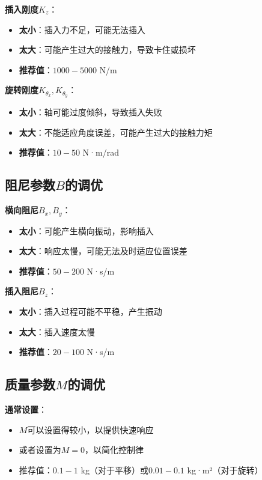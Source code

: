 \documentclass[12pt,a4paper]{article}
\begin{document}
\textbf{插入刚度$K_z$}：
\begin{itemize}
\item \textbf{太小}：插入力不足，可能无法插入
\item \textbf{太大}：可能产生过大的接触力，导致卡住或损坏
\item \textbf{推荐值}：$1000-5000$ N/m
\end{itemize}

\textbf{旋转刚度$K_{\theta_x}, K_{\theta_y}$}：
\begin{itemize}
\item \textbf{太小}：轴可能过度倾斜，导致插入失败
\item \textbf{太大}：不能适应角度误差，可能产生过大的接触力矩
\item \textbf{推荐值}：$10-50$ N·m/rad
\end{itemize}

\subsection{阻尼参数$B$的调优}

\textbf{横向阻尼$B_x, B_y$}：
\begin{itemize}
\item \textbf{太小}：可能产生横向振动，影响插入
\item \textbf{太大}：响应太慢，可能无法及时适应位置误差
\item \textbf{推荐值}：$50-200$ N·s/m
\end{itemize}

\textbf{插入阻尼$B_z$}：
\begin{itemize}
\item \textbf{太小}：插入过程可能不平稳，产生振动
\item \textbf{太大}：插入速度太慢
\item \textbf{推荐值}：$20-100$ N·s/m
\end{itemize}

\subsection{质量参数$M$的调优}

\textbf{通常设置}：
\begin{itemize}
\item $M$可以设置得较小，以提供快速响应
\item 或者设置为$M = 0$，以简化控制律
\item 推荐值：$0.1-1$ kg（对于平移）或$0.01-0.1$ kg·m²（对于旋转）
\end{itemize}
\end{document}
